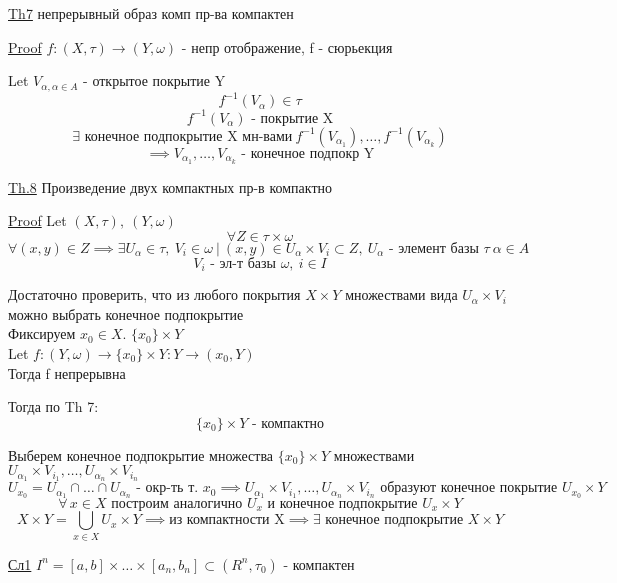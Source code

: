\documentclass[a4paper]{article}
\begin{document}
\begin{tcolorbox}
\underline{Th7} непрерывный образ комп пр-ва компактен

\underline{Proof} $ f: (X,\tau) \to (Y, \omega) $ - непр отображение, f - сюрьекция 

Let $ V_{\alpha, \alpha \in A} $ - открытое покрытие Y
\[
    f^{-1}(V_\alpha) \in \tau
\]
\[
    f^{-1}(V_\alpha) \text{ - покрытие X}
\]
\[
    \exists \text{ конечное подпокрытие X мн-вами} \ f^{-1}(V_{\alpha_1}), \dots
    , f^{-1}(V_{\alpha_k})
\]
\[
    \implies V_{\alpha_1}, \dots, V_{\alpha_k} \text{ - конечное подпокр Y}
\]
\end{tcolorbox}

\begin{tcolorbox}
\underline{Th.8} Произведение двух компактных пр-в компактно

\underline{Proof} Let $ (X, \tau), \ (Y, \omega) $ 
\[
    \forall Z \in \tau \times \omega
\]
\[
    \forall(x,y) \in Z \implies \exists U_\alpha \in \tau, \ V_i \in \omega \ | \ 
    (x,y) \in U_\alpha \times V_i \subset Z, \ U_\alpha \text{ - элемент базы }\tau
    \ \alpha \in A
\]
\[
    V_i \text{ - эл-т базы }\omega, \ i \in I
\]

Достаточно проверить, что из любого покрытия $ X \times Y $ множествами вида 
$ U_\alpha \times V_i $ можно выбрать конечное подпокрытие\\
Фиксируем $ x_0 \in X $. $ \{ x_0 \} \times Y $ \\
Let $ f: (Y, \omega) \to \{x_0 \} \times Y: Y \to (x_0, Y) $ \\
Тогда f непрерывна

Тогда по Th 7:
\[
    \{ x_0 \} \times Y \text{ - компактно}
\]

Выберем конечное подпокрытие множества $ \{ x_0 \} \times Y $ множествами
$ U_{\alpha_1} \times V_{i_1}, \dots, U_{\alpha_n}\times V_{i_n} $ 
\[
    U_{x_0} = U_{\alpha_1} \cap \dots \cap U_{\alpha_n} \text{ - окр-ть т. } x_0
    \implies  U_{\alpha_1} \times V_{i_1}, \dots, U_{\alpha_n}\times V_{i_n} 
    \text{ образуют конечное покрытие } U_{x_0} \times Y
\]
\[
    \forall \, x \in X \text{ построим аналогично } U_x \text{ и конечное подпокрытие }
    U_x \times Y
\]
\[
    X \times Y = \bigcup_{x \in X} U_x \times Y \implies \text{из компактности X}
    \implies \exists \text{ конечное подпокрытие } X \times Y
\]

\underline{Сл1} $ I^{n} = [a,b] \times \dots \times [a_n, b_n] \subset (R^{n}, \tau_0) $ 
- компактен
\end{tcolorbox}
\end{document}
